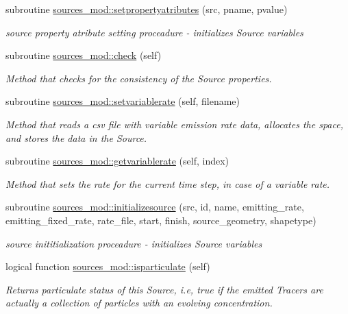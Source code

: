\begin{DoxyCompactItemize}
subroutine \mbox{\hyperlink{namespacesources__mod_abbb4557b46c533439fe258cecf31a76c}{sources\+\_\+mod\+::setpropertyatributes}} (src, pname, pvalue)
\begin{DoxyCompactList}\small\item\em source property atribute setting proceadure -\/ initializes Source variables \end{DoxyCompactList}\item 
subroutine \mbox{\hyperlink{namespacesources__mod_a6fcfcb690cd1b9375915b01f7ddbe801}{sources\+\_\+mod\+::check}} (self)
\begin{DoxyCompactList}\small\item\em Method that checks for the consistency of the Source properties. \end{DoxyCompactList}\item 
subroutine \mbox{\hyperlink{namespacesources__mod_af7fab14b56573184d5ca4371409118b0}{sources\+\_\+mod\+::setvariablerate}} (self, filename)
\begin{DoxyCompactList}\small\item\em Method that reads a csv file with variable emission rate data, allocates the space, and stores the data in the Source. \end{DoxyCompactList}\item 
subroutine \mbox{\hyperlink{namespacesources__mod_a0d56083fdc0453f03f9dfdb24f704ac4}{sources\+\_\+mod\+::getvariablerate}} (self, index)
\begin{DoxyCompactList}\small\item\em Method that sets the rate for the current time step, in case of a variable rate. \end{DoxyCompactList}\item 
subroutine \mbox{\hyperlink{namespacesources__mod_aef3551e97236f03fc73fcf77276bb318}{sources\+\_\+mod\+::initializesource}} (src, id, name, emitting\+\_\+rate, emitting\+\_\+fixed\+\_\+rate, rate\+\_\+file, start, finish, source\+\_\+geometry, shapetype)
\begin{DoxyCompactList}\small\item\em source inititialization proceadure -\/ initializes Source variables \end{DoxyCompactList}\item 
logical function \mbox{\hyperlink{namespacesources__mod_ac4e4f33da78d030e1b56a48789da6a05}{sources\+\_\+mod\+::isparticulate}} (self)
\begin{DoxyCompactList}\small\item\em Returns particulate status of this Source, i.\+e, true if the emitted Tracers are actually a collection of particles with an evolving concentration. \end{DoxyCompactList}\item 

\end{DoxyCompactItemize}
